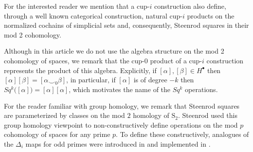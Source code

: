 \begin{remark}
	For the interested reader we mention that a cup-$i$ construction also define, through a well known categorical construction, natural cup-$i$ products on the normalized cochains of simplicial sets \cite{friedman2012simplicial} and, consequently, Steenrod squares in their mod 2 cohomology.
\end{remark}

\begin{remark}
	Although in this article we do not use the algebra structure on the mod 2 cohomology of spaces, we remark that the cup-$0$ product of a cup-$i$ construction represents the product of this algebra.
	Explicitly, if $[\alpha], [\beta] \in H^\bullet$ then $[\alpha][\beta] = [\alpha \smallsmile_0 \beta]$, in particular, if $[\alpha]$ is of degree $-k$ then $Sq^k\big([\alpha]\big) = [\alpha] [\alpha]$, which motivates the name of the $Sq^k$ operations.
\end{remark}

\begin{remark}
	For the reader familiar with group homology, we remark that Steenrod squares are parameterized by classes on the mod $2$ homology of $\mathrm S_2$.
	Steenrod used this group homology viewpoint to non-constructively define operations on the mod $p$ cohomology of spaces \cite{steenrod1962cohomology} for any prime $p$.
	To define these constructively, analogues of the $\Delta_i$ maps for odd primes were introduced in \cite{medina2020maysteenrod} and implemented in \cite{medina2021computer}.
\end{remark}